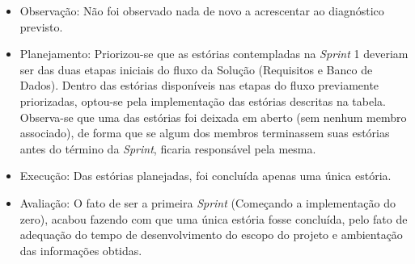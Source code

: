\begin{itemize}
\item Observação: Não foi observado nada de novo a acrescentar ao diagnóstico previsto.
\item Planejamento: Priorizou-se que as estórias contempladas na \textit{Sprint} 1 deveriam ser das duas etapas iniciais do fluxo da Solução (Requisitos e Banco de Dados). Dentro das estórias disponíveis nas etapas do fluxo previamente priorizadas, optou-se pela implementação das estórias descritas na tabela. Observa-se que uma das estórias foi deixada em aberto (sem nenhum membro associado), de forma que se algum dos membros terminassem suas estórias antes do término da \textit{Sprint}, ficaria responsável pela mesma.
\item Execução: Das estórias planejadas, foi concluída apenas uma única estória.
\item Avaliação: O fato de ser a primeira \textit{Sprint} (Começando a implementação do zero), acabou fazendo com que uma única estória fosse concluída, pelo fato de adequação do tempo de desenvolvimento do escopo do projeto e ambientação das informações obtidas.
\end{itemize}

 \clearpage

